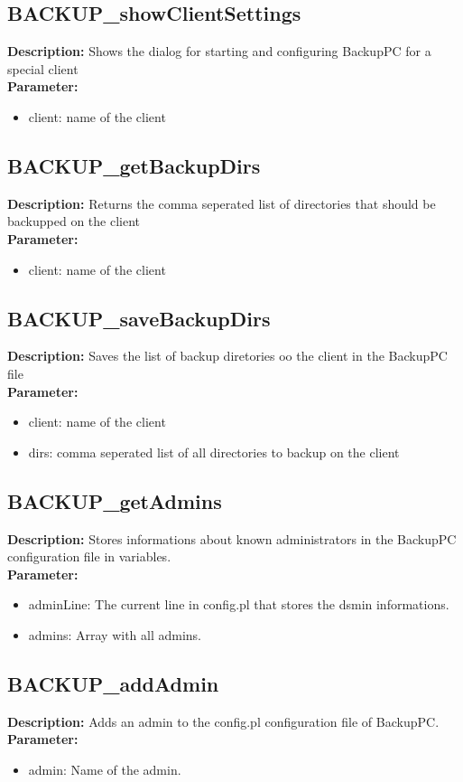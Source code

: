 \subsection{BACKUP\_showClientSettings}
\textbf{Description:} Shows the dialog for starting and configuring BackupPC for a special client\\
\textbf{Parameter:}
\begin{itemize}
\item client: name of the client
\end{itemize}

\subsection{BACKUP\_getBackupDirs}
\textbf{Description:} Returns the comma seperated list of directories that should be backupped on the client\\
\textbf{Parameter:}
\begin{itemize}
\item client: name of the client
\end{itemize}

\subsection{BACKUP\_saveBackupDirs}
\textbf{Description:} Saves the list of backup diretories oo the client in the BackupPC file\\
\textbf{Parameter:}
\begin{itemize}
\item client: name of the client
\item dirs: comma seperated list of all directories to backup on the client
\end{itemize}

\subsection{BACKUP\_getAdmins}
\textbf{Description:} Stores informations about known administrators in the BackupPC configuration file in variables.\\
\textbf{Parameter:}
\begin{itemize}
\item adminLine: The current line in config.pl that stores the dsmin informations.
\item admins: Array with all admins.
\end{itemize}

\subsection{BACKUP\_addAdmin}
\textbf{Description:} Adds an admin to the config.pl configuration file of BackupPC.\\
\textbf{Parameter:}
\begin{itemize}
\item admin: Name of the admin.
\end{itemize}

